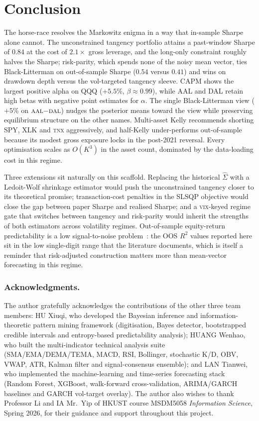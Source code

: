 \documentclass[runningheads]{llncs}
\begin{document}
\section{Conclusion}\label{sec:conclusion}
The horse-race resolves the Markowitz enigma in a way that
in-sample Sharpe alone cannot. The unconstrained tangency portfolio
attains a past-window Sharpe of $\num{0.84}$ at the cost of
$2.1\!\times$ gross leverage, and the long-only constraint roughly
halves the Sharpe; risk-parity, which spends none of the noisy mean
vector, ties Black-Litterman on out-of-sample Sharpe ($\num{0.54}$
versus $\num{0.41}$) and wins on drawdown depth versus the
vol-targeted tangency sleeve. CAPM shows the largest positive alpha on
QQQ ($+5.5\%$, $\beta\!\approx\!0.99$), while AAL and DAL retain
high betas with negative point estimates for $\alpha$. The single Black-Litterman view
($+5\%$ on $\textsc{aal}{-}\textsc{dal}$) nudges the posterior
means toward the view while preserving equilibrium structure on the
other names. Multi-asset Kelly recommends shorting SPY, XLK and \textsc{tnx}
aggressively, and half-Kelly under-performs out-of-sample because its
modest gross exposure locks in the post-2021 reversal. Every
optimisation scales as $O(K^{3})$ in the asset count, dominated by
the data-loading cost in this regime.

Three extensions sit naturally on this scaffold. Replacing the
historical $\hat\Sigma$ with a Ledoit-Wolf shrinkage estimator would
push the unconstrained tangency closer to its theoretical promise;
transaction-cost penalties in the SLSQP objective would close the
gap between paper Sharpe and realised Sharpe; and a
\textsc{vix}-keyed regime gate that switches between tangency and
risk-parity would inherit the strengths of both estimators across
volatility regimes. Out-of-sample equity-return predictability is a
low signal-to-noise problem~\cite{rapach2010}: the OOS $R^{2}$ values
reported here sit in the low single-digit range that the literature
documents, which is itself a reminder that risk-adjusted construction
matters more than mean-vector forecasting in this regime.

\subsubsection*{Acknowledgments.}
The author gratefully acknowledges the contributions of the other three
team members:
HU Xiuqi, who developed the Bayesian inference and information-theoretic
pattern mining framework (digitisation, Bayes detector, bootstrapped
credible intervals and entropy-based predictability analysis);
HUANG Wenhao, who built the multi-indicator technical analysis suite
(SMA/EMA/DEMA/TEMA, MACD, RSI, Bollinger, stochastic K/D, OBV, VWAP,
ATR, Kalman filter and signal-consensus ensemble);
and LAN Tianwei, who implemented the machine-learning and time-series
forecasting stack (Random Forest, XGBoost, walk-forward cross-validation,
ARIMA/GARCH baselines and GARCH vol-target overlay).
The author also wishes to thank Professor Li and IA Mr.\ Yip of HKUST
course MSDM5058 \emph{Information Science}, Spring 2026, for their
guidance and support throughout this project.



\end{document}
